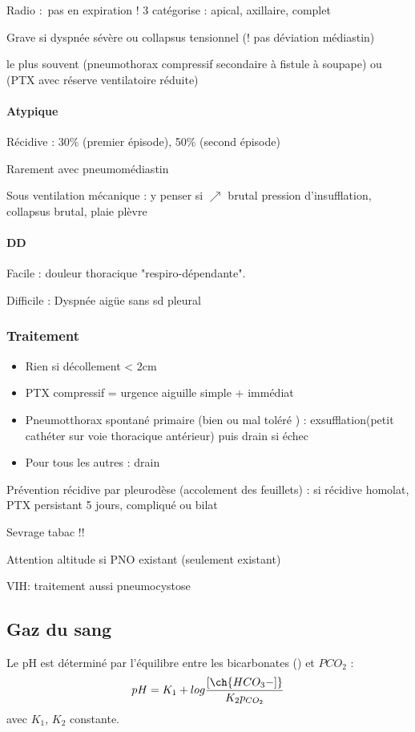 \documentclass[11pt]{article}
\begin{document}
Radio : pas en expiration ! 3 catégorise : apical, axillaire, complet

Grave si dyspnée sévère ou collapsus tensionnel (! pas déviation médiastin) 

\thus le plus souvent (pneumothorax compressif secondaire à fistule à
soupape) ou (PTX avec réserve ventilatoire réduite)

\paragraph{Atypique}
\label{sec:org468dcde}
Récidive : 30\% (premier épisode), 50\% (second épisode)

Rarement avec pneumomédiastin

Sous ventilation mécanique : y penser si \(\nearrow\) brutal pression
d'insufflation, collapsus brutal, plaie plèvre

\paragraph{DD}
\label{sec:org6d37e7d}
Facile : douleur thoracique "respiro-dépendante".

Difficile : Dyspnée aigüe sans sd pleural 

\subsubsection{Traitement}
\label{sec:org8e79895}

\begin{itemize}
\item Rien si décollement < 2cm
\item PTX compressif = urgence \thus aiguille simple + immédiat
\item Pneumotthorax spontané primaire (bien ou mal toléré ) :
exsufflation(petit cathéter sur voie thoracique antérieur) puis drain
si échec
\item Pour tous les autres : drain
\end{itemize}


Prévention récidive par pleurodèse (accolement des feuillets) : si récidive
homolat, PTX persistant 5 jours, compliqué ou bilat

Sevrage tabac !!

Attention altitude si PNO existant (seulement existant)

VIH: traitement aussi pneumocystose


\subsection{Gaz du sang}
\label{sec:org0453bba}
\label{appendix:gds}
Le pH est déterminé par l'équilibre entre les bicarbonates () et
\(PCO_2\) :
\begin{equation}
  pH = K_1 + log\frac{[\ch{HCO_3-]}}{K_2 p_{CO_2}}
\end{equation}
avec \(K_1\), \(K_2\) constante.
\end{document}
